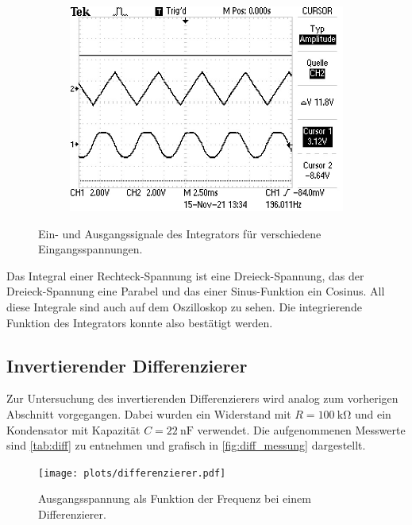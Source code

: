 \begin{figure}[H]
\begin{subfigure}{.4\textwidth}
    \includegraphics[width=\linewidth]{data/ALL0061/F0061TEK.JPG}
  \end{subfigure}
  \caption{Ein- und Ausgangssignale des Integrators für verschiedene Eingangsspannungen.}
  \label{fig:int_oszi}
\end{figure}

Das Integral einer Rechteck-Spannung ist eine Dreieck-Spannung, das der Dreieck-Spannung eine Parabel und das einer Sinus-Funktion ein Cosinus. All diese Integrale sind auch auf dem Oszilloskop zu sehen. Die integrierende Funktion des Integrators konnte also bestätigt werden.

\subsection{Invertierender Differenzierer}
Zur Untersuchung des invertierenden Differenzierers wird analog zum vorherigen Abschnitt vorgegangen. Dabei wurden ein Widerstand mit $R = \SI{100}{\kilo\ohm}$ und ein Kondensator mit Kapazität $C = \SI{22}{\nano\farad}$ verwendet. Die aufgenommenen Messwerte sind \autoref{tab:diff} zu entnehmen und grafisch in \autoref{fig:diff_messung} dargestellt.

\begin{figure}[H]
  \centering
  \texttt{[image: plots/differenzierer.pdf]}
  \caption{Ausgangsspannung als Funktion der Frequenz bei einem Differenzierer.}
  \label{fig:diff_messung}
\end{figure}

